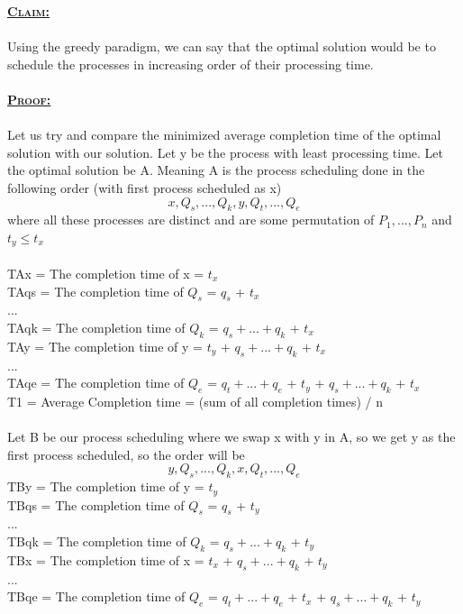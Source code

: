 \documentclass[a4 paper]{article}
\begin{document}
\newpage
{}
\textbf{\underline{\textsc{Claim:}}} \\\\
Using the greedy paradigm, we can say that the optimal solution would be to schedule the processes in increasing order of their processing time.\\\\
\textbf{\underline{\textsc{Proof:}}}\\\\
Let us try and compare the minimized average completion time of the optimal solution with our solution. Let y be the process with least processing time. Let the optimal solution be A. Meaning A is the process scheduling done in the following order (with first process scheduled as x)  $$x,Q_{s},...,Q_{k},y,Q_{t},...,Q_{e}$$ where all these processes are distinct and are some permutation of $P_{1},...,P_{n}$ and $t_{y} \leq t_{x}$\\\\
TAx = The completion time of x = $t_{x}$\\
TAqs = The completion time of $Q_{s}$ = $q_{s}$ + $t_{x}$\\
...\\
TAqk = The completion time of $Q_{k}$ = $q_{s} + ... + q_{k}$ + $t_{x}$\\
TAy = The completion time of y = $t_{y}$ + $q_{s} + ... + q_{k}$ + $t_{x}$ \\ 
...\\
TAqe = The completion time of $Q_{e}$ = $q_{t} + ... + q_{e}$ + $t_{y}$ + $q_{s} + ... + q_{k}$ + $t_{x}$\\
T1 = Average Completion time = (sum of all completion times) / n\\\\
Let B be our process scheduling where we swap x with y in A, so we get y as the first process scheduled, so the order will be  $$y,Q_{s},...,Q_{k},x,Q_{t},...,Q_{e}$$
TBy = The completion time of y = $t_{y}$\\
TBqs = The completion time of $Q_{s}$ = $q_{s}$ + $t_{y}$\\
...\\
TBqk = The completion time of $Q_{k}$ = $q_{s} + ... + q_{k}$ + $t_{y}$\\
TBx = The completion time of x = $t_{x}$ + $q_{s} + ... + q_{k}$ + $t_{y}$ \\ 
...\\
TBqe = The completion time of $Q_{e}$ = $q_{t} + ... + q_{e}$ + $t_{x}$ + $q_{s} + ... + q_{k}$ + $t_{y}$\\
\end{document}
